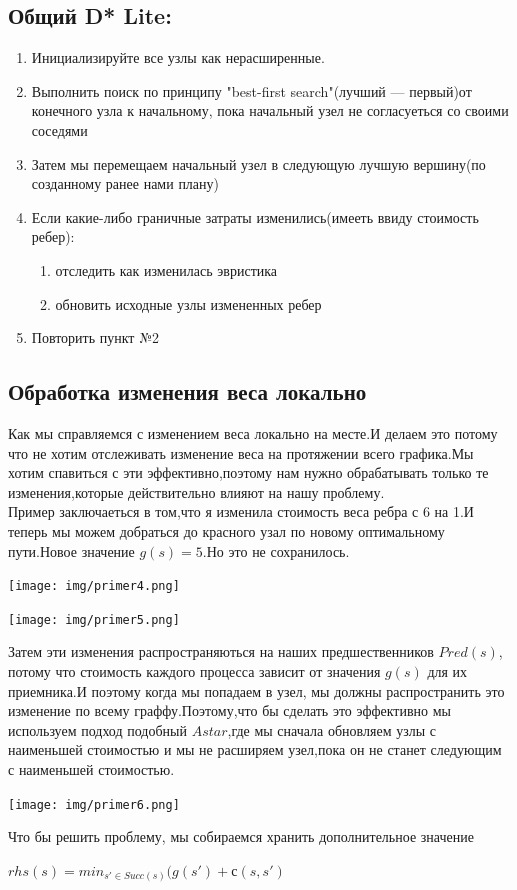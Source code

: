 \documentclass[12pt]{article}
\begin{document}
\subsection*{Общий D* Lite:}
\begin{enumerate}
    \item Инициализируйте все узлы как нерасширенные.
    \item Выполнить поиск по принципу "best-first search"(лучший — первый)от конечного узла к начальному, пока начальный узел не согласуеться со своими соседями
    \item Затем мы перемещаем начальный узел в следующую лучшую вершину(по созданному ранее нами плану)
    \item Если какие-либо граничные затраты изменились(имееть ввиду стоимость ребер):
    \begin{enumerate} 
        \item отследить как изменилась эвристика
        \item обновить исходные узлы измененных ребер
    \end{enumerate}
    \item Повторить пункт №2
\end{enumerate}
\subsection*{Обработка изменения веса локально}
Как мы справляемся с изменением веса локально на месте.И делаем это потому что не хотим отслеживать изменение веса на протяжении всего графика.Мы хотим спавиться с эти эффективно,поэтому нам нужно обрабатывать только те изменения,которые действительно влияют на нашу проблему.\\
Пример заключаеться в том,что я изменила стоимость веса ребра с 6 на 1.И теперь мы можем добраться до красного узал по новому оптимальному пути.Новое значение $g(s)=5$.Но это не сохранилось.
\begin{center}
        \texttt{[image: img/primer4.png]}
\end{center}
\begin{center}
        \texttt{[image: img/primer5.png]}
\end{center}
Затем эти изменения распространяються на наших предшественников $Pred(s)$, потому что стоимость каждого процесса зависит от значения $g(s)$ для их приемника.И поэтому когда мы попадаем в узел, мы должны распространить это изменение по всему граффу.Поэтому,что бы сделать это эффективно мы используем подход подобный $A star$,где мы сначала обновляем узлы с наименьшей стоимостью и мы не расширяем узел,пока он не станет следующим с наименьшей стоимостью.
\begin{center}
        \texttt{[image: img/primer6.png]}
\end{center}
Что бы решить проблему, мы собираемся хранить дополнительное значение 
\begin{center}
       $rhs(s)=min_{s'\in Succ(s)}(g(s')+с(s,s')$
\end{center}
\end{document}
